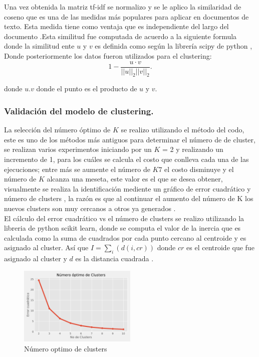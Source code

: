Una vez obtenida la matriz tf-idf se normalizo y se le aplico la similaridad de coseno que es una de las medidas más populares para aplicar en documentos de texto. Esta medida tiene como ventaja que es independiente del largo del documento \cite{Huang2008}.Esta similitud fue computada de acuerdo a la siguiente formula donde la similitud ente $u$  y $v$ es definida como  según la librería scipy de python \cite{scipy}, Donde posteriormente los datos fueron utilizados para el clustering:
$$   1 - \frac{u \cdot v}
{||u||_2 ||v||_2}. $$

donde $u.v$ donde el punto es el producto de $u$ y $v$.

\subsubsection{Validación del modelo de clustering.}

La selección del número óptimo de $K$ se realizo utilizando el método del codo, este es uno de los métodos más antiguos para determinar el número de de cluster, se realizan varios experimentos iniciando por un $K$ = 2 y realizando un incremento de 1, para los cuáles se calcula el costo que conlleva cada una de las ejecuciones; entre más se aumente el número de $K7$ el costo disminuye y el número de $K$ alcanza una meseta, este valor es el que se desea obtener, visualmente se realiza la identificación mediente un gráfico de error cuadrático y número de clusters , la razón es que al continuar el aumento del número de K los nuevos clusters son muy cercanos a otros ya generados \cite{Kodinariya2013}.\\   

El cálculo del error cuadrático vs el número de clusters se realizo utilizando la libreria de python scikit learn, donde se computa el valor de la inercia que es calculada como la suma de cuadrados por cada punto cercano al centroide y es asignado al cluster. Así que  $I = \sum_{i}(d(i,cr))$ donde $cr$ es el centroide que fue asignado al cluster y $d$ es la distancia cuadrada \cite{scikit-learn}. 

\begin{figure}[H] 
	\centering
	\includegraphics[width=0.5\textwidth]{Kap4/Clusters}
	\caption{Número optimo de clusters} 
	\label{fig:Clusters}
\end{figure}

